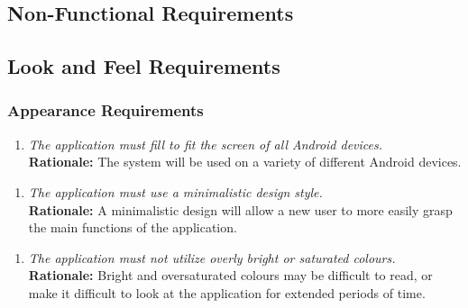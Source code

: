 \documentclass[]{article}
\begin{document}
\begin{enumerate}[{\bf BE1.}]

\section{Non-Functional Requirements}
\label{sec:non-functional_requirements}


\subsection{Look and Feel Requirements}
\label{sub:look_and_feel_requirements}


\subsubsection{Appearance Requirements}
\label{ssub:appearance_requirements}
\begin{enumerate}[{LF-A}1. ]
    \item \emph{The application must fill to fit the screen of all Android devices.}\\
        {\bf Rationale:} The system will be used on a variety of different Android devices.
\end{enumerate}
\begin{enumerate}[{LF-A}2. ]
    \item \emph{The application must use a minimalistic design style.}\\
        {\bf Rationale:} A minimalistic design will allow a new user to more easily grasp the main functions of the application.    
\end{enumerate}
\begin{enumerate}[{LF-A}3. ]
    \item \emph{The application must not utilize overly bright or saturated colours.}\\
        {\bf Rationale:} Bright and oversaturated colours may be difficult to read, or make it difficult to look at the application for extended periods of time.
\end{enumerate}



\end{enumerate}
\end{document}
